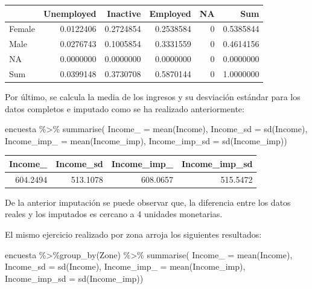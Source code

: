 \documentclass[
  12pt,
]{book}
\newenvironment{Shaded}{\begin{snugshade}}{\end{snugshade}}
\newcommand{\AttributeTok}[1]{\textcolor[rgb]{0.77,0.63,0.00}{#1}}
\newcommand{\FunctionTok}[1]{\textcolor[rgb]{0.00,0.00,0.00}{#1}}
\newcommand{\NormalTok}[1]{#1}
\newcommand{\SpecialCharTok}[1]{\textcolor[rgb]{0.00,0.00,0.00}{#1}}
\begin{document}
\begin{tabular}{l|r|r|r|r|r}
\hline
  & Unemployed & Inactive & Employed & NA & Sum\\
\hline
Female & 0.0122406 & 0.2724854 & 0.2538584 & 0 & 0.5385844\\
\hline
Male & 0.0276743 & 0.1005854 & 0.3331559 & 0 & 0.4614156\\
\hline
NA & 0.0000000 & 0.0000000 & 0.0000000 & 0 & 0.0000000\\
\hline
Sum & 0.0399148 & 0.3730708 & 0.5870144 & 0 & 1.0000000\\
\hline
\end{tabular}

Por último, se calcula la media de los ingresos y su desviación estándar para los datos completos e imputado como se ha realizado anteriormente:

\begin{Shaded}
\begin{Highlighting}[]
\NormalTok{encuesta }\SpecialCharTok{\%\textgreater{}\%} \FunctionTok{summarise}\NormalTok{(}
  \AttributeTok{Income\_ =} \FunctionTok{mean}\NormalTok{(Income),}
  \AttributeTok{Income\_sd =} \FunctionTok{sd}\NormalTok{(Income),}
  \AttributeTok{Income\_imp\_ =} \FunctionTok{mean}\NormalTok{(Income\_imp),}
  \AttributeTok{Income\_imp\_sd =} \FunctionTok{sd}\NormalTok{(Income\_imp))}
\end{Highlighting}
\end{Shaded}

\begin{tabular}{r|r|r|r}
\hline
Income\_ & Income\_sd & Income\_imp\_ & Income\_imp\_sd\\
\hline
604.2494 & 513.1078 & 608.0657 & 515.5472\\
\hline
\end{tabular}

De la anterior imputación se puede observar que, la diferencia entre los datos reales y los imputados es cercano a 4 unidades monetarias.

El mismo ejercicio realizado por zona arroja los siguientes resultados:

\begin{Shaded}
\begin{Highlighting}[]
\NormalTok{encuesta }\SpecialCharTok{\%\textgreater{}\%}\FunctionTok{group\_by}\NormalTok{(Zone) }\SpecialCharTok{\%\textgreater{}\%}  \FunctionTok{summarise}\NormalTok{(}
  \AttributeTok{Income\_ =} \FunctionTok{mean}\NormalTok{(Income),}
  \AttributeTok{Income\_sd =} \FunctionTok{sd}\NormalTok{(Income),}
  \AttributeTok{Income\_imp\_ =} \FunctionTok{mean}\NormalTok{(Income\_imp),}
  \AttributeTok{Income\_imp\_sd =} \FunctionTok{sd}\NormalTok{(Income\_imp))}
\end{Highlighting}
\end{Shaded}
\end{document}
